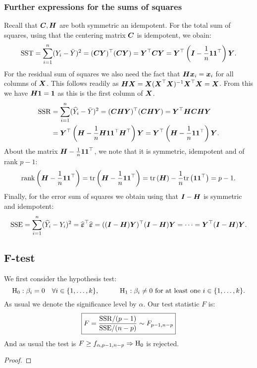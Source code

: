 \subsubsection{Further expressions for the sums of squares}
Recall that $\mC, \mH$ are both symmetric an idempotent. For the total sum of squares, using that the centering matrix $\mC$ is idempotent, we obain:
\begin{align*}
    \mr{SST} = \sum_{i=1}^n(Y_i-\bar{Y})^2 = (\mC\Y)^\top(\mC\Y) = \Y^\top \mC \Y = \Y^\top\brac{\mI-\frac{1}{n}\one\one^\top}\Y.
\end{align*}
For the residual sum of squares we also need the fact that $\mH\x_i=\x_i$ for all columns of $\X$. This follows readily as $\mH\X=\X(\X^\top\X)^{-1}\X^\top\X=\X$. From this we have $\mH\one = \one$ as this is the first column of $\X$. 
\begin{align*}
    \mr{SSR} 
    &= \sum_{i=1}^n(\hat{Y}_i-\bar{Y})^2 
    = (\mC\mH\Y)^\top(\mC\mH\Y) 
    = \Y^\top\mH\mC\mH\Y 
    \\&= \Y^\top\brac{\mH-\frac{1}{n}\mH\one\one^\top\mH^\top}\Y 
    = \Y^\top\brac{\mH-\frac{1}{n}\one\one^\top}\Y.
\end{align*}
About the matrix $\mH-\frac{1}{n}\one\one^\top$, we note that it is symmetric, idempotent and of rank $p-1$:
$$
    \rank{\mH-\frac{1}{n}\one\one^\top} = \tr{\mH-\frac{1}{n}\one\one^\top} = \tr{\mH}-\frac{1}{n}\tr{\one\one^\top}=p-1.
$$
Finally, for the error sum of squares we obtain using that $\mI-\mH$ is symmetric and idempotent:
$$
    \mr{SSE} = \sum_{i=1}^n(\hat{Y}_i-Y_i)^2 = \Eh^\top\Eh = ((\mI-\mH)\Y)^\top(\mI-\mH)\Y = \dots = \Y^\top(\mI-\mH)\Y.
$$
\subsection{F-test}
We first consider the hypothesis test:
$$
    \mr{H}_0 : \b_i = 0 \quad\forall i\in\{1,\dots,k\},
    \quad\quad\quad
    \mr{H}_1 : \b_i \ne 0 \textrm{ for at least one } i\in\{1,\dots,k\}.
$$
As usual we denote the significance level by $\alpha$. Our test statistic $F$ is:
\begin{align}
    \boxed{F = \frac{\mr{SSR}/(p-1)}{\mr{SSE}/(n-p)} \sim F_{p-1,n-p}}
\end{align}
And as usual the test is $F \geq f_{\alpha, p-1,n-p} \Rightarrow \mr{H}_0$ is rejected.
\begin{proof}
\end{proof}

